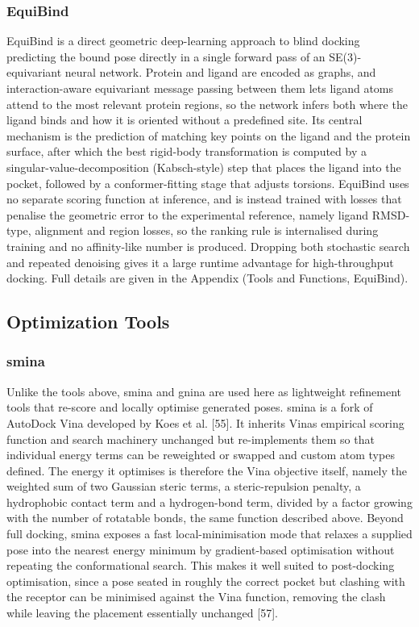 \hypertarget{equibind}{%
\subsubsection{EquiBind}\label{equibind}}

EquiBind is a direct geometric deep-learning approach to blind docking predicting the bound pose directly in a single forward pass of an SE(3)-equivariant neural network. Protein and ligand are encoded as graphs, and interaction-aware equivariant message passing between them lets ligand atoms attend to the most relevant protein regions, so the network infers both where the ligand binds and how it is oriented without a predefined site. Its central mechanism is the prediction of matching key points on the ligand and the protein surface, after which the best rigid-body transformation is computed by a singular-value-decomposition (Kabsch-style) step that places the ligand into the pocket, followed by a conformer-fitting stage that adjusts torsions. EquiBind uses no separate scoring function at inference, and is instead trained with losses that penalise the geometric error to the experimental reference, namely ligand RMSD-type, alignment and region losses, so the ranking rule is internalised during training and no affinity-like number is produced. Dropping both stochastic search and repeated denoising gives it a large runtime advantage for high-throughput docking. Full details are given in the Appendix (Tools and Functions, EquiBind).

\hypertarget{optimization-tools}{%
\subsection{Optimization Tools}\label{optimization-tools}}

\hypertarget{smina}{%
\subsubsection{smina}\label{smina}}

Unlike the tools above, smina and gnina are used here as lightweight refinement tools that re-score and locally optimise generated poses. smina is a fork of AutoDock Vina developed by Koes et al. {[}55{]}. It inherits Vina\textquotesingle s empirical scoring function and search machinery unchanged but re-implements them so that individual energy terms can be reweighted or swapped and custom atom types defined. The energy it optimises is therefore the Vina objective itself, namely the weighted sum of two Gaussian steric terms, a steric-repulsion penalty, a hydrophobic contact term and a hydrogen-bond term, divided by a factor growing with the number of rotatable bonds, the same function described above. Beyond full docking, smina exposes a fast local-minimisation mode that relaxes a supplied pose into the nearest energy minimum by gradient-based optimisation without repeating the conformational search. This makes it well suited to post-docking optimisation, since a pose seated in roughly the correct pocket but clashing with the receptor can be minimised against the Vina function, removing the clash while leaving the placement essentially unchanged {[}57{]}.

